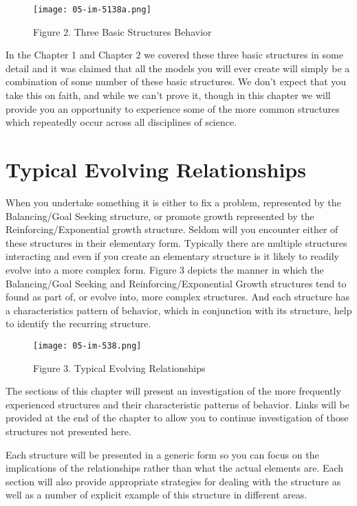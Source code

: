 \documentclass[]{memoir}
\let\Oldincludegraphics\includegraphics
\renewcommand{\includegraphics}[1]{\Oldincludegraphics[max size={\textwidth}{\textheight}]{#1}}
\begin{document}
\begin{figure}[htbp]
\centering
\texttt{[image: 05-im-5138a.png]}
\caption{Figure 2. Three Basic Structures Behavior}
\end{figure}

In the Chapter 1 and Chapter 2 we covered these three basic structures
in some detail and it was claimed that all the models you will ever
create will simply be a combination of some number of these basic
structures. We don't expect that you take this on faith, and while we
can't prove it, though in this chapter we will provide you an
opportunity to experience some of the more common structures which
repeatedly occur across all disciplines of science.

\section{Typical Evolving Relationships}

When you undertake something it is either to fix a problem, represented
by the Balancing/Goal Seeking structure, or promote growth represented
by the Reinforcing/Exponential growth structure. Seldom will you
encounter either of these structures in their elementary form. Typically
there are multiple structures interacting and even if you create an
elementary structure is it likely to readily evolve into a more complex
form. Figure 3 depicts the manner in which the Balancing/Goal Seeking
and Reinforcing/Exponential Growth structures tend to found as part of,
or evolve into, more complex structures. And each structure has a
characteristics pattern of behavior, which in conjunction with its
structure, help to identify the recurring structure.

\begin{figure}[htbp]
\centering
\texttt{[image: 05-im-538.png]}
\caption{Figure 3. Typical Evolving Relationships}
\end{figure}

The sections of this chapter will present an investigation of the more
frequently experienced structures and their characteristic patterns of
behavior. Links will be provided at the end of the chapter to allow you
to continue investigation of those structures not presented here.

Each structure will be presented in a generic form so you can focus on
the implications of the relationships rather than what the actual
elements are. Each section will also provide appropriate strategies for
dealing with the structure as well as a number of explicit example of
this structure in different areas.
\end{document}
